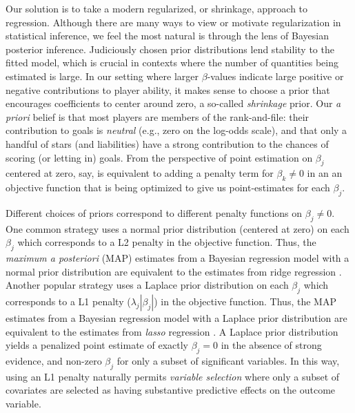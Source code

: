 
Our solution is to take a modern regularized, or shrinkage, approach to
regression.  Although there are many ways to view or motivate regularization
in statistical inference, we feel the most natural is through the lens of
Bayesian posterior inference. Judiciously chosen prior distributions lend
stability to the fitted model, which is crucial in contexts where the number
of quantities being estimated is large. In our setting where larger
$\beta$-values indicate large positive or negative contributions to player
ability, it makes sense to choose a prior that encourages coefficients to
center around zero, a so-called {\em shrinkage} prior.  Our {\em a priori}
belief is that most players are members of the rank-and-file: their
contribution to goals is {\em neutral} (e.g., zero on the log-odds scale), and
that only a handful of stars (and liabilities) have a strong contribution to
the chances of scoring (or letting in) goals.  From the perspective of point
estimation on $\beta_j$ centered at zero, say, is equivalent to adding a
penalty term for $\beta_k \ne 0$ in an an objective function that is being
optimized to give us point-estimates for each $\beta_j$.

Different choices of priors correspond to different penalty functions on
$\beta_j \ne 0$. One common strategy uses a normal prior distribution
(centered at zero) on each $\beta_j$ which corresponds to a L2 penalty in the
objective function.  Thus, the {\em maximum a posteriori} (MAP) estimates from
a Bayesian regression model with a normal prior distribution are equivalent to
the estimates from ridge regression \cite{HoeKen70}. Another popular strategy
uses a Laplace prior distribution on each $\beta_j$ which corresponds to a L1
penalty ($\lambda_j |\beta_j|$) in the objective function.  Thus, the MAP
estimates from a Bayesian regression model with a Laplace prior distribution
are equivalent to the estimates from {\it lasso} regression \cite{Tib96}.  A
Laplace prior distribution yields a penalized point estimate of exactly
$\beta_j=0$ in the absence of strong evidence, and non-zero $\beta_j$ for only
a subset of significant variables.  In this way, using an L1 penalty naturally
permits {\it variable selection} where only a subset of covariates are
selected as having substantive predictive effects on the outcome variable.
  
